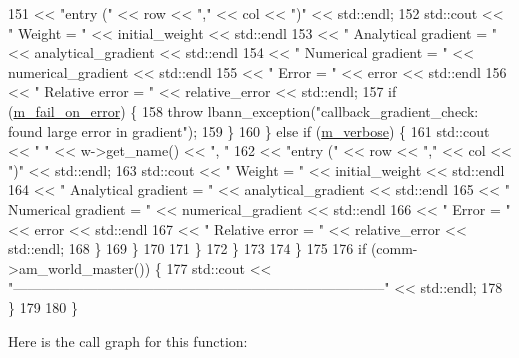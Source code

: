 \begin{DoxyCode}
151                       << \textcolor{stringliteral}{"entry ("} << row << \textcolor{stringliteral}{","} << col << \textcolor{stringliteral}{")"} << std::endl;
152             std::cout << \textcolor{stringliteral}{"    Weight              = "} << initial\_weight << std::endl
153                       << \textcolor{stringliteral}{"    Analytical gradient = "} << analytical\_gradient << std::endl
154                       << \textcolor{stringliteral}{"    Numerical gradient  = "} << numerical\_gradient << std::endl
155                       << \textcolor{stringliteral}{"    Error               = "} << error << std::endl
156                       << \textcolor{stringliteral}{"    Relative error      = "} << relative\_error << std::endl;
157             \textcolor{keywordflow}{if} (\hyperlink{classlbann_1_1lbann__callback__gradient__check_ac05a23972812866458fff241de0bb324}{m\_fail\_on\_error}) \{
158               \textcolor{keywordflow}{throw} lbann\_exception(\textcolor{stringliteral}{"callback\_gradient\_check: found large error in gradient"});
159             \}
160           \} \textcolor{keywordflow}{else} \textcolor{keywordflow}{if} (\hyperlink{classlbann_1_1lbann__callback__gradient__check_a9a8669004ccfc3b76963ba13252600d3}{m\_verbose}) \{
161             std::cout << \textcolor{stringliteral}{"  "} << w->get\_name() << \textcolor{stringliteral}{", "}
162                       << \textcolor{stringliteral}{"entry ("} << row << \textcolor{stringliteral}{","} << col << \textcolor{stringliteral}{")"} << std::endl;
163             std::cout << \textcolor{stringliteral}{"    Weight              = "} << initial\_weight << std::endl
164                       << \textcolor{stringliteral}{"    Analytical gradient = "} << analytical\_gradient << std::endl
165                       << \textcolor{stringliteral}{"    Numerical gradient  = "} << numerical\_gradient << std::endl
166                       << \textcolor{stringliteral}{"    Error               = "} << error << std::endl
167                       << \textcolor{stringliteral}{"    Relative error      = "} << relative\_error << std::endl;
168           \}
169         \}
170 
171       \}
172     \}
173 
174   \}
175 
176   \textcolor{keywordflow}{if} (comm->am\_world\_master()) \{
177     std::cout << \textcolor{stringliteral}{"--------------------------------------------------------------------------------"} << 
      std::endl;
178   \}
179 
180 \}
\end{DoxyCode}
Here is the call graph for this function\+:\nopagebreak
